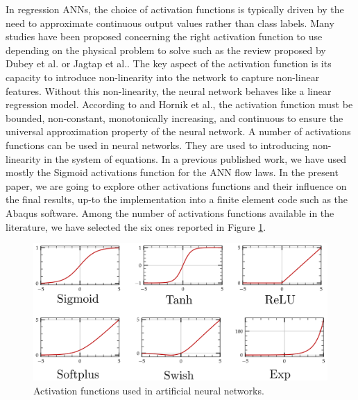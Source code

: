 \documentclass[algorithms,article,submit,pdftex,moreauthors]{Definitions/mdpi}
\makeatletter
\DeclareRobustCommand{\eal}{et al.\@\xspace}
\makeatother
\begin{document}
In regression ANNs, the choice of activation functions is typically driven by the need to approximate continuous output values rather than class labels.
Many studies have been proposed concerning the right activation function to use depending on the physical problem to solve such as the review proposed by Dubey \eal \cite{Dubey-2022-AFD} or Jagtap \eal \cite{Jagtap-2023-HIA}.
The key aspect of the activation function is its capacity to introduce non-linearity into the network to capture non-linear features.
Without this non-linearity, the neural network behaves like a linear regression model.
According to and Hornik \eal \cite{Hornik-1989-MFN}, the activation function must be bounded, non-constant, monotonically increasing, and continuous to ensure the universal approximation property of the neural network.
A number of activations functions can be used in neural networks.
They are used to introducing non-linearity in the system of equations.
In a previous published work, we have used mostly the Sigmoid activations function for the ANN flow laws.
In the present paper, we are going to explore other activations functions and their influence on the final results, up-to the implementation into a finite element code such as the Abaqus software.
Among the number of activations functions available in the literature, we have selected the six ones reported in Figure \ref{fig:Act}.
\begin{figure}[h]
\centering
\includegraphics[width=0.8\columnwidth]{Figures/act}
\caption{Activation functions used in artificial neural networks.}
\label{fig:Act}
\end{figure}
\end{document}
